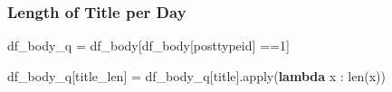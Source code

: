 \documentclass[
  letterpaper,
  DIV=11,
  numbers=noendperiod]{scrartcl}
\newenvironment{Shaded}{\begin{snugshade}}{\end{snugshade}}
\newcommand{\BuiltInTok}[1]{\textcolor[rgb]{0.00,0.23,0.31}{#1}}
\newcommand{\KeywordTok}[1]{\textcolor[rgb]{0.00,0.23,0.31}{\textbf{#1}}}
\newcommand{\NormalTok}[1]{\textcolor[rgb]{0.00,0.23,0.31}{#1}}
\newcommand{\OperatorTok}[1]{\textcolor[rgb]{0.37,0.37,0.37}{#1}}
\newcommand{\StringTok}[1]{\textcolor[rgb]{0.13,0.47,0.30}{#1}}
\begin{document}
\subsubsection{Length of Title per Day}\label{length-of-title-per-day}

\begin{Shaded}
\begin{Highlighting}[]
\NormalTok{df\_body\_q }\OperatorTok{=}\NormalTok{ df\_body[df\_body[}\StringTok{\textquotesingle{}posttypeid\textquotesingle{}}\NormalTok{] }\OperatorTok{==}\StringTok{\textquotesingle{}1\textquotesingle{}}\NormalTok{]}
\end{Highlighting}
\end{Shaded}

\begin{Shaded}
\begin{Highlighting}[]
\NormalTok{df\_body\_q[}\StringTok{\textquotesingle{}title\_len\textquotesingle{}}\NormalTok{] }\OperatorTok{=}\NormalTok{ df\_body\_q[}\StringTok{\textquotesingle{}title\textquotesingle{}}\NormalTok{].}\BuiltInTok{apply}\NormalTok{(}\KeywordTok{lambda}\NormalTok{ x : }\BuiltInTok{len}\NormalTok{(x))}
\end{Highlighting}
\end{Shaded}
\end{document}
